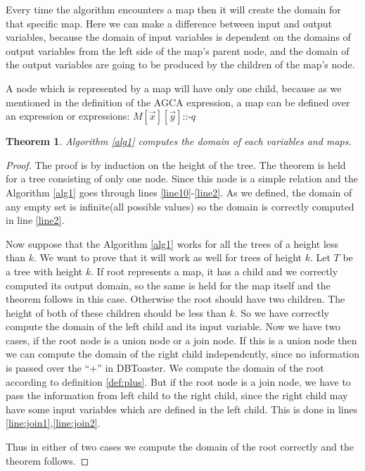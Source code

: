 \documentclass[12pt]{article}
\newtheorem{theorem}{Theorem}[section]
\begin{document}
	Every time the algorithm encounters a map then it will create the domain for that specific map. Here we can make a difference between input and output variables, because the domain of input variables is dependent on the domains of output variables from the left side of the map's parent node, and the domain of the output variables are going to be produced by the children of the map's node. %

A node which is represented by a map will have only one child, because as we mentioned in the definition of the AGCA expression, a map can be defined over an expression or expressions: $M[\vec{x}][\vec{y}]\text{::-}q$
\begin{theorem}
Algorithm \ref{alg1} computes the domain of each variables and maps.
\end{theorem}

\begin{proof}
The proof is by induction on the height of the tree. The theorem is held for a tree consisting of only one node. Since this node is a simple relation and the Algorithm \ref{alg1} goes  through lines \ref{line10}-\ref{line2}. As we defined, the domain of any empty set is infinite(all possible values) so the domain is correctly computed in line \ref{line2}.

Now suppose that the Algorithm \ref{alg1} works for all the trees of a height less than $k$. We want to prove that it will work as well for trees of height $k$. Let $T$ be a tree with height $k$. If root represents a map, it has a child and we correctly computed its output domain, so the same is held for the map itself and the theorem follows in this case. Otherwise
the root should have two children. The height of both of these children should be less than $k$. So we have correctly compute the domain of the left child and its input variable. Now we have two cases, if the root node is a union node or a join node. If this is a union node then we can compute the domain of the right child independently, since no information is passed over the ``+'' in DBToaster\cite{1}. We compute the domain of the root according to definition \eqref{def:plus}. But if the root node is a join node, we have to pass the information from left child to the right child, since the right child may have some input variables which are defined in the left child. This is done in lines \ref{line:join1},\ref{line:join2}.\par
Thus in either of two cases we compute the domain of the root correctly and the theorem follows.
\end{proof}
\end{document}
